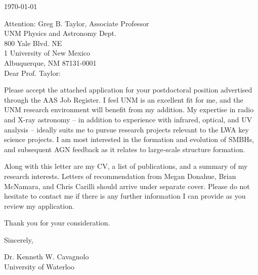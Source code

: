 \documentclass[11pt]{article}
\begin{document}
\today

Attention: Greg B. Taylor, Associate Professor\\
UNM Physics and Astronomy Dept.\\
800 Yale Blvd. NE\\
1 University of New Mexico\\
Albuquerque, NM 87131-0001\\

Dear Prof. Taylor:

Please accept the attached application for your postdoctoral position
advertised through the AAS Job Register. I feel UNM is an excellent
fit for me, and the UNM research environment will benefit from my
addition. My expertise in radio and X-ray astronomy -- in addition to
experience with infrared, optical, and UV analysis -- ideally suits me
to pursue research projects relevant to the LWA key science
projects. I am most interested in the formation and evolution of
SMBHs, and subsequent AGN feedback as it relates to large-scale
structure formation.

Along with this letter are my CV, a list of publications, and a
summary of my research interests. Letters of recommendation from Megan
Donahue, Brian McNamara, and Chris Carilli should arrive under
separate cover. Please do not hesitate to contact me if there is any
further information I can provide as you review my application.

Thank you for your consideration.

Sincerely,\\
\begin{minipage}{7.5in}
\end{minipage}
Dr. Kenneth W. Cavagnolo\\
University of Waterloo
\end{document}
